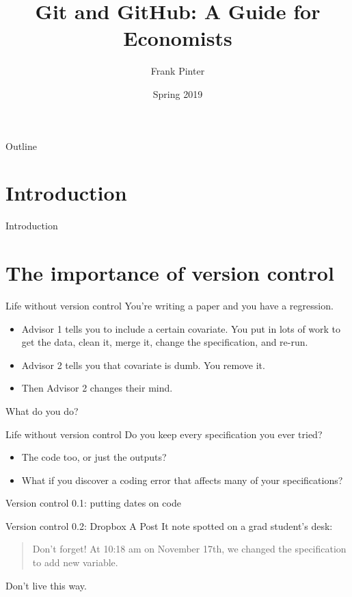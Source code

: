 \documentclass{beamer}
\title[Git for Economists]{Git and GitHub: A Guide for Economists}
\author{Frank Pinter}
\date{Spring 2019}
\begin{document}
\begin{frame}
  \titlepage
\end{frame}

\begin{frame}{Outline}
  \tableofcontents
\end{frame}

\section*{Introduction}

\begin{frame}{Introduction}
\end{frame}

\section{The importance of version control}

\begin{frame}{Life without version control}
You're writing a paper and you have a regression.
\begin{itemize}
\item Advisor 1 tells you to include a certain covariate. You put in lots of work to get the data, clean it, merge it, change the specification, and re-run.
\item Advisor 2 tells you that covariate is dumb. You remove it.
\item Then Advisor 2 changes their mind.
\end{itemize}
What do you do?
\end{frame}

\begin{frame}{Life without version control}
Do you keep every specification you ever tried?
\begin{itemize}
\item The code too, or just the outputs?
\item What if you discover a coding error that affects many of your specifications?
\end{itemize}
\end{frame}


\begin{frame}{Version control 0.1: putting dates on code}
\end{frame}

\begin{frame}{Version control 0.2: Dropbox}
A Post It note spotted on a grad student's desk:
\begin{quote}
	Don't forget! At 10:18 am on November 17th, we changed the specification to add new variable.
\end{quote}
Don't live this way.
\end{frame}
\end{document}
